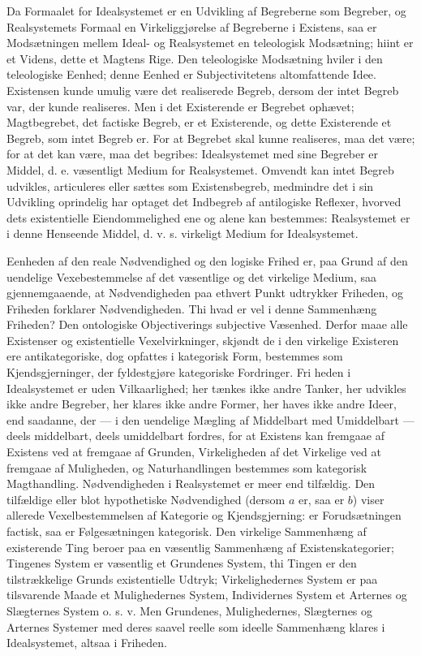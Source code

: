 \documentclass[11pt]{book}
\newcommand{\opage}[1]{\marginnote{\footnotesize\textit{[#1]}}}
\begin{document}
Da Formaalet for Idealsystemet er en Udvikling af Begreberne som
Begreber, og Realsystemets Formaal en Virkeliggjørelse af Begreberne i
Existens, saa er Modsætningen mellem Ideal- og Realsystemet en
teleologisk Modsætning; hiint er et Videns, dette et Magtens Rige. Den
teleologiske Modsætning hviler i den teleologiske Eenhed; denne Eenhed er
Subjectivitetens altomfattende Idee. Existensen kunde umulig være det
realiserede Begreb, dersom der intet Begreb var, der kunde realiseres.
Men i det Existerende er Begrebet ophævet; Magtbegrebet, det factiske
Begreb, er et Existerende, og dette Existerende et Begreb, som intet
Begreb er. For at Begrebet skal kunne realiseres, maa det være; for at
det kan være, maa det begribes: Idealsystemet med sine Begreber er
Middel, d. e. væsentligt Medium for Realsystemet. Omvendt kan intet
Begreb udvikles, articuleres eller sættes som Existensbegreb, medmindre
det i sin Udvikling oprindelig har optaget det Indbegreb af antilogiske
Reflexer, hvorved dets existentielle Eiendommelighed ene og alene kan
bestemmes: Realsystemet er i denne Henseende Middel, d. v. s. virkeligt
Medium for Idealsystemet.

Eenheden af den reale Nødvendighed og den logiske Frihed er, paa Grund af
den uendelige Vexebestemmelse af det væsentlige og det virkelige Medium,
saa gjennemgaaende, at Nødvendigheden paa ethvert Punkt udtrykker
Friheden, og Friheden forklarer Nødvendigheden. Thi hvad er vel i denne
Sammenhæng Friheden? Den ontologiske Objectiverings subjective
Væsenhed. Derfor maae alle Existenser og existentielle Vexelvirkninger,
skjøndt de i den virkelige Existeren ere antikategoriske, dog opfattes i
kategorisk Form, bestemmes som Kjendsgjerninger, der fyldestgjøre
kategoriske Fordringer. Fri\-%
\opage{229} \setcounter{footnote}{0}%
heden i Idealsystemet er uden Vilkaarlighed; her tænkes ikke andre
Tanker, her udvikles ikke andre Begreber, her klares ikke andre Former,
her haves ikke andre Ideer, end saadanne, der --- i den uendelige
Mægling af Middelbart med Umiddelbart --- deels middelbart, deels
umiddelbart fordres, for at Existens kan fremgaae af Existens ved at
fremgaae af Grunden, Virkeligheden af det Virkelige ved at fremgaae af
Muligheden, og Naturhandlingen bestemmes som kategorisk Magthandling.
Nødvendigheden i Realsystemet er meer end tilfældig. Den tilfældige eller
blot hypothetiske Nødvendighed (dersom $a$ er, saa er $b$) viser allerede
Vexelbestemmelsen af Kategorie og Kjendsgjerning: er Forudsætningen
factisk, saa er Følgesætningen kategorisk. Den virkelige Sammenhæng af
existerende Ting beroer paa en væsentlig Sammenhæng af
Existenskategorier; Tingenes System er væsentlig et Grundenes System, thi
Tingen er den tilstrækkelige Grunds existentielle Udtryk;
Virkelighedernes System er paa tilsvarende Maade et Mulighedernes System,
Individernes System et Arternes og Slægternes System o. s. v. Men
Grundenes, Mulighedernes, Slægternes og Arternes Systemer med deres
saavel reelle som ideelle Sammenhæng klares i Idealsystemet, altsaa i
Friheden.
\end{document}

